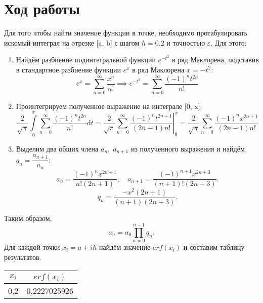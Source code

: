 \documentclass[a4paper,12pt]{article}
\begin{document}
{\section{Ход работы}
\hspace*{1.25cm}Для того чтобы найти значение функции в точке, необходимо протабулировать искомый интеграл на отрезке [a, b] с шагом $h = 0.2$ и точностью $\varepsilon$. Для этого:
\begin{enumerate}
    \item Найдём разбиение подинтегральной функции $e^{-t^2}$ в ряд Маклорена, подставив в стандартное разбиение функции $e^x$ в ряд Маклорена $x = -t^2$:
    \begin{equation}
        e^x = \sum_{n = 0}^{\infty}\frac{x^n}{n!} \implies e^{-t^2} = \sum_{n = 0}^{\infty}\frac{(-1)^n t^{2n}}{n!}
    \end{equation}
    \item Проинтегрируем полученное выражение на интеграле [0, x]:
    \begin{equation}
        \frac{2}{\sqrt{\pi}}\int\limits_{0}^{x}\sum_{n = 0}^{\infty}\frac{(-1)^n t^{2n}}{n!}\mathrm{d}t = \frac{2}{\sqrt{\pi}}\left.\sum_{n = 0}^{\infty}\frac{(-1)^n t^{2n+1}}{(2n-1)n!}\right|_{0}^{x} = \frac{2}{\sqrt{\pi}}\sum_{n = 0}^{\infty}\frac{(-1)^n x^{2n+1}}{(2n-1)n!}
    \end{equation}
    \item Выделим два общих члена $a_n, \; a_{n + 1}$ из полученного выражения и найдём\\ $q_n = \dfrac{a_{n+1}}{a_n}$:
    \begin{equation}
        a_{n}=\frac{(-1)^{n}x^{2n+1}}{n!(2n+1)}, \quad a_{n+1}=\frac{(-1)^{n+1}x^{2n+3}}{(n+1)!(2n+3)}.
    \end{equation}
    \begin{equation}
        q_{n}=\frac{-x^{2}(2n+1)}{(n+1)(2n+3)}.
    \end{equation}
\end{enumerate}
Таким образом,
\begin{equation}
	a_{n}=a_{0}\prod_{n=0}^{n-1} q_{n}.
\end{equation}
Для каждой точки $x_i = a + i  h$ найдём значение $erf(x_i)$ и составим таблицу результатов.
\begin{table}[h]
    \centering
    \begin{tabular}{|c|c|}
        \hline
        $x_i$ & $erf(x_i)$\\
        \hline
        0,2 & 0,2227025926\\

\end{tabular}
\end{table}}
\end{document}
